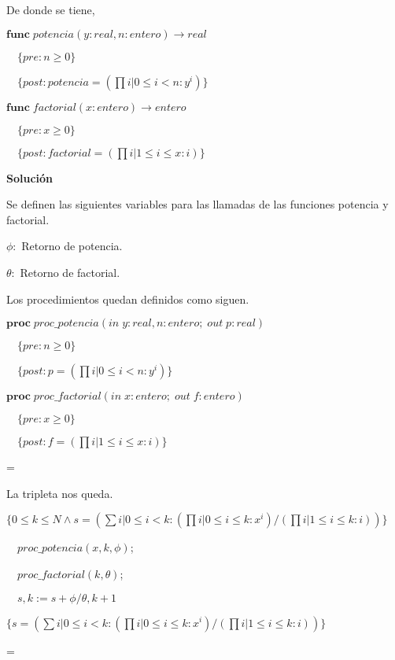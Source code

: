 \documentclass[hidelinks]{article}
\newenvironment{absolutelynopagebreak}
{\par\nobreak\vfil\penalty0\vfilneg
	\vtop\bgroup}
{\par\xdef\tpd{\the\prevdepth}\egroup
	\prevdepth=\tpd}
\begin{document}
De donde se tiene, \par

$\textbf{func} \; potencia(y: real, n: entero) \rightarrow real$ \par
$\quad \{pre: n \geq 0\}$ \par
$\quad \{post: potencia= (\prod i| 0 \leq i < n: y^i)\}$\par

$\textbf{func} \; factorial(x: entero) \rightarrow entero$ \par
$\quad \{pre: x \geq 0\}$ \par
$\quad \{post: factorial= (\prod i| 1 \leq i \leq x: i)\}$\par

\textbf{Solución}\par

Se definen las siguientes variables para las llamadas de las funciones potencia
y factorial.\par

$\phi: $ Retorno de potencia.\par
$\theta: $ Retorno de factorial.\par

Los procedimientos quedan definidos como siguen.\par
\begin{absolutelynopagebreak}
	$\textbf{proc} \; proc\_potencia(in \; y: real, n: entero; \; out \; p: real)$ \par
	$\quad \{pre: n \geq 0\}$ \par
	$\quad \{post: p = (\prod i| 0 \leq i < n: y^i)\}$\par

	$\textbf{proc} \; proc\_factorial(in \; x: entero; \; out \; f: entero)$ \par
	$\quad \{pre: x \geq 0\}$ \par
	$\quad \{post: f = (\prod i| 1 \leq i \leq x: i)\}$\par
\end{absolutelynopagebreak}

La tripleta nos queda. \par

\begin{absolutelynopagebreak}
	$\{0 \leq k \leq N \land s = (\sum i| 0 \leq i < k: (\prod i| 0 \leq i \leq k : x^i) / (\prod i| 1 \leq i \leq k : i))\}$ \par
	$\quad proc\_potencia(x,k,\phi)$; \par
	$\quad proc\_factorial(k,\theta)$; \par
	$\quad s,k := s + \phi/\theta, k + 1$ \par
	$\{ s = (\sum i| 0 \leq i < k: (\prod i| 0 \leq i \leq k : x^i) / (\prod i| 1 \leq i \leq k : i))\}$ \par
\end{absolutelynopagebreak}
\end{document}
